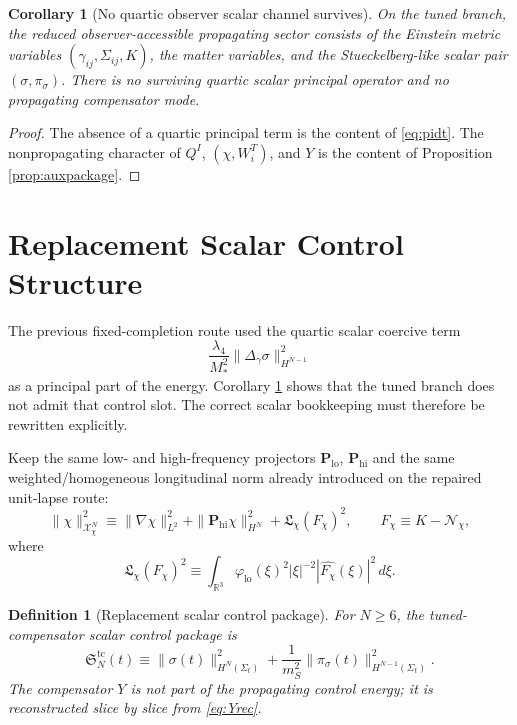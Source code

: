 \documentclass[11pt]{article}
\newtheorem{definition}{Definition}
\newtheorem{corollary}{Corollary}
\begin{document}
\begin{corollary}[No quartic observer scalar channel survives]
\label{cor:noquartic}
On the tuned branch, the reduced observer-accessible propagating sector consists of the Einstein metric variables \((\gamma_{ij},\Sigma_{ij},K)\), the matter variables, and the Stueckelberg-like scalar pair \((\sigma,\pi_\sigma)\). There is no surviving quartic scalar principal operator and no propagating compensator mode.
\end{corollary}

\begin{proof}
The absence of a quartic principal term is the content of \eqref{eq:pidt}. The nonpropagating character of \(Q^I\), \((\chi,W_i^T)\), and \(Y\) is the content of Proposition \ref{prop:auxpackage}.
\end{proof}

\section{Replacement Scalar Control Structure}

The previous fixed-completion route used the quartic scalar coercive term
\[
\frac{\lambda_4}{M_*^2}\|\Delta_\gamma\sigma\|_{H^{N-1}}^2
\]
as a principal part of the energy. Corollary \ref{cor:noquartic} shows that the tuned branch does not admit that control slot. The correct scalar bookkeeping must therefore be rewritten explicitly.

Keep the same low- and high-frequency projectors \(\mathbf P_{\mathrm{lo}}\), \(\mathbf P_{\mathrm{hi}}\) and the same weighted/homogeneous longitudinal norm already introduced on the repaired unit-lapse route:
\begin{equation}
\|\chi\|_{\mathcal X_\chi^N}^2
\equiv
\|\nabla\chi\|_{L^2}^2
+\|\mathbf P_{\mathrm{hi}}\chi\|_{H^N}^2
+\mathfrak L_\chi(F_\chi)^2,
\qquad
F_\chi\equiv K-\mathcal N_\chi,
\label{eq:Xchi}
\end{equation}
where
\begin{equation}
\mathfrak L_\chi(F_\chi)^2
\equiv
\int_{\mathbb R^3}
\varphi_{\mathrm{lo}}(\xi)^2|\xi|^{-2}|\widehat{F_\chi}(\xi)|^2\,d\xi.
\label{eq:Lchi}
\end{equation}

\begin{definition}[Replacement scalar control package]
\label{def:scalarcontrol}
For \(N\ge 6\), the \emph{tuned-compensator scalar control package} is
\begin{equation}
\mathfrak S_N^{\mathrm{tc}}(t)
\equiv
\|\sigma(t)\|_{H^N(\Sigma_t)}^2
+\frac{1}{m_S^2}\|\pi_\sigma(t)\|_{H^{N-1}(\Sigma_t)}^2.
\label{eq:SNtc}
\end{equation}
The compensator \(Y\) is not part of the propagating control energy; it is reconstructed slice by slice from \eqref{eq:Yrec}.
\end{definition}
\end{document}
